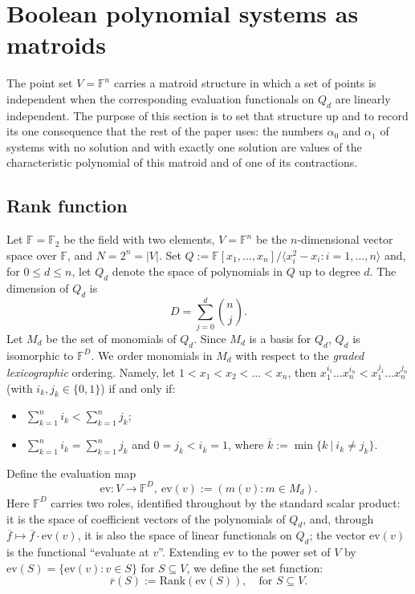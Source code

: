\documentclass[11pt,a4paper]{article}
\theoremstyle{definition}
\newcommand{\FF}{\mathbb{F}}
\begin{document}
\section{Boolean polynomial systems as matroids} \label{sec:matroid}

The point set $V=\FF^n$ carries a matroid structure in which a set of points is
independent when the corresponding evaluation functionals on $Q_d$ are linearly
independent. The purpose of this section is to set that structure up and to record
its one consequence that the rest of the paper uses: the numbers $\alpha_0$ and
$\alpha_1$ of systems with no solution and with exactly one solution are values of
the characteristic polynomial of this matroid and of one of its contractions.

\subsection{Rank function}

Let $\mathbb{F} = \mathbb{F}_2$ be the field with two elements, $V = \mathbb{F}^n$ be the $n$-dimensional vector space over $\mathbb{F}$, and $N = 2^n = |V|$.
Set $Q := \mathbb{F}[x_1, \dots, x_n] / \langle x_i^2 - x_i : i = 1, \dots, n \rangle$ and, for $0 \le d \le n$, let $Q_d$ denote the space of polynomials in $Q$ up to degree $d$. The dimension of $Q_d$ is 
\[
D = \sum_{j=0}^d \binom{n}{j}.
\]
Let $M_d$ be the set of monomials of $Q_d$. Since $M_d$ is a basis for $Q_d$, $Q_d$ is isomorphic to $\mathbb{F}^D$. 
We order monomials in $M_d$ with respect to the \textit{graded lexicographic} ordering. Namely, let $1<x_1<x_2<\dots<x_n$, then $x_1^{i_1}\dots x_n^{i_n} < x_1^{j_1}\dots x_n^{j_n}$ (with $i_k,j_k \in \{0,1\}$) if and only if: \begin{itemize}
    \item $\sum_{k=1}^ni_k < \sum_{k=1}^nj_k$;
    \item $\sum_{k=1}^ni_k = \sum_{k=1}^nj_k$ and $0 = j_{\overline{k}} < i_{\overline{k}} = 1$, where $\overline{k} := \min\{k \ | \ i_k \neq j_k \}$.
\end{itemize}
Define the evaluation map \[ \mathrm{ev} : V \to \mathbb{F}^D,\  \mathrm{ev}(v) := (m(v) : m \in M_d).\] Here $\mathbb{F}^D$ carries two roles, identified throughout by the standard scalar product: it is the space of coefficient vectors of the polynomials of $Q_d$, and, through $\overline{f}\mapsto\overline{f}\cdot\mathrm{ev}(v)$, it is also the space of linear functionals on $Q_d$; the vector $\mathrm{ev}(v)$ is the functional ``evaluate at $v$''. Extending $\mathrm{ev}$ to the power set of $V$ by $\mathrm{ev}(S) = \{\mathrm{ev}(v) : v \in S\}$ for $S \subseteq V$, we define the set function:
\[
\overline{r}(S) := \mathrm{Rank}(\mathrm{ev}(S)), \quad \text{for } S \subseteq V.
\]
\end{document}

